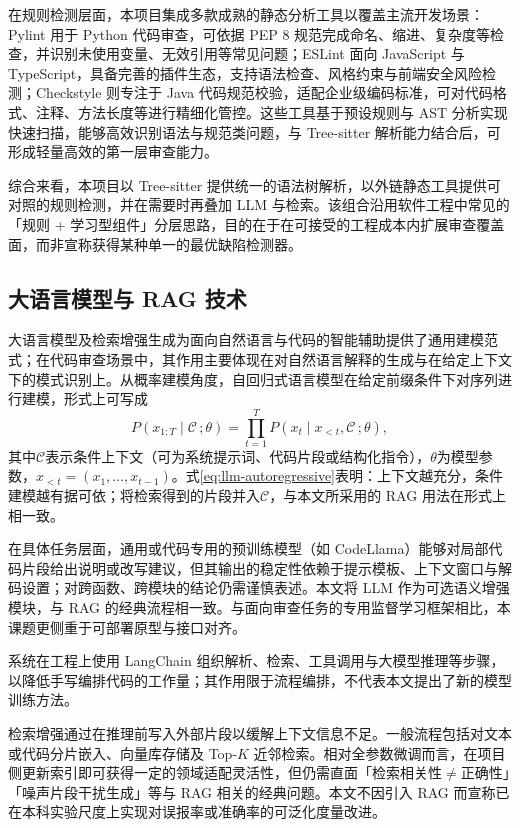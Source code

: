 在规则检测层面，本项目集成多款成熟的静态分析工具以覆盖主流开发场景：Pylint 用于 Python 代码审查，可依据 PEP 8 规范完成命名、缩进、复杂度等检查，并识别未使用变量、无效引用等常见问题；ESLint 面向 JavaScript 与 TypeScript，具备完善的插件生态，支持语法检查、风格约束与前端安全风险检测；Checkstyle 则专注于 Java 代码规范校验，适配企业级编码标准，可对代码格式、注释、方法长度等进行精细化管控。这些工具基于预设规则与 AST 分析实现快速扫描，能够高效识别语法与规范类问题，与 Tree-sitter 解析能力结合后，可形成轻量高效的第一层审查能力。

综合来看，本项目以 Tree-sitter 提供统一的语法树解析，以外链静态工具提供可对照的规则检测，并在需要时再叠加 LLM 与检索。该组合沿用软件工程中常见的「规则 + 学习型组件」分层思路，目的在于在可接受的工程成本内扩展审查覆盖面，而非宣称获得某种单一的最优缺陷检测器。

\subsection{大语言模型与 RAG 技术}
大语言模型及检索增强生成为面向自然语言与代码的智能辅助提供了通用建模范式；在代码审查场景中，其作用主要体现在对自然语言解释的生成与在给定上下文下的模式识别上\cite{hou2024llmse,zhang2024surveyllmse}。从概率建模角度，自回归式语言模型在给定前缀条件下对序列进行建模，形式上可写成
\begin{equation}
P\left(x_{1:T}\mid \mathcal{C}\,;\theta\right)=\prod_{t=1}^{T} P\!\left(x_{t}\mid x_{<t},\mathcal{C}\,;\theta\right),
\label{eq:llm-autoregressive}
\end{equation}
其中$\mathcal{C}$表示条件上下文（可为系统提示词、代码片段或结构化指令），$\theta$为模型参数，$x_{<t}=(x_1,\ldots,x_{t-1})$。式\eqref{eq:llm-autoregressive}表明：上下文越充分，条件建模越有据可依；将检索得到的片段并入$\mathcal{C}$，与本文所采用的 RAG 用法在形式上相一致。

在具体任务层面，通用或代码专用的预训练模型（如 CodeLlama）能够对局部代码片段给出说明或改写建议，但其输出的稳定性依赖于提示模板、上下文窗口与解码设置\cite{roziere2023codellama}；对跨函数、跨模块的结论仍需谨慎表述。本文将 LLM 作为可选语义增强模块，与 RAG 的经典流程相一致\cite{lewis2020retrieval,hou2024llmse,feng2020codebert}。与面向审查任务的专用监督学习框架相比，本课题更侧重于可部署原型与接口对齐\cite{li2022codereviewer}。

系统在工程上使用 LangChain 组织解析、检索、工具调用与大模型推理等步骤，以降低手写编排代码的工作量；其作用限于流程编排，不代表本文提出了新的模型训练方法。

检索增强通过在推理前写入外部片段以缓解上下文信息不足。一般流程包括对文本或代码分片嵌入、向量库存储及 Top-$K$ 近邻检索。相对全参数微调而言，在项目侧更新索引即可获得一定的领域适配灵活性，但仍需直面「检索相关性$\neq$正确性」「噪声片段干扰生成」等与 RAG 相关的经典问题\cite{lewis2020retrieval}。本文不因引入 RAG 而宣称已在本科实验尺度上实现对误报率或准确率的可泛化度量改进。


